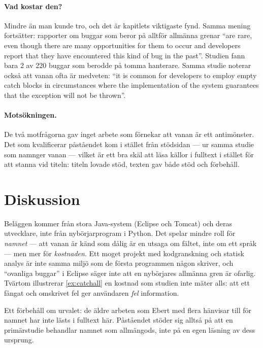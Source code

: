 \paragraph{Vad kostar den?}
Mindre än man kunde tro, och det är kapitlets viktigaste fynd.  Samma
mening fortsätter: rapporter om buggar som beror på alltför allmänna
grenar \enquote{are rare, even though there are many opportunities for
them to occur and developers report that they have encountered this kind
of bug in the past}\autocite[83]{EbertCastor2015}.  Studien fann bara 2
av 220 buggar som berodde på tomma hanterare.  Samma studie noterar
också att vanan ofta är medveten: \enquote{it is common for developers to
employ empty catch blocks in circumstances where the implementation of
the system guarantees that the exception will not be
thrown}\autocite[99]{EbertCastor2015}.

\paragraph{Motsökningen.}
De två motfrågorna gav inget arbete som förnekar att vanan är ett
antimönster.  Det som kvalificerar påståendet kom i stället från
stödsidan --- ur samma studie som namnger vanan --- vilket är ett bra
skäl att läsa källor i fulltext i stället för att stanna vid titeln:
titeln lovade stöd, texten gav både stöd och förbehåll.

\section{Diskussion}
\label{sec:ca-diskussion}

Beläggen kommer från stora Java-system (Eclipse och Tomcat) och deras
utvecklare, inte från nybörjarprogram i Python.  Det spelar mindre roll
för \emph{namnet} --- att vanan är känd som dålig är en utsaga om
fältet, inte om ett språk --- men mer för \emph{kostnaden}.  Ett moget
projekt med kodgranskning och statisk analys är inte samma miljö som de
första programmen någon skriver, och \enquote{ovanliga buggar} i Eclipse
säger inte att en nybörjares allmänna gren är ofarlig.  Tvärtom illustrerar
\cref{ex:catchall} en kostnad som studien inte mäter alls: att ett fångat
och omskrivet fel ger användaren \emph{fel} information.

Ett förbehåll om urvalet: de äldre arbeten som Ebert med flera hänvisar
till för namnet har inte lästs i fulltext här.  Påståendet stöder sig
alltså på att en primärstudie behandlar namnet som allmängods, inte på en
egen läsning av dess ursprung.

